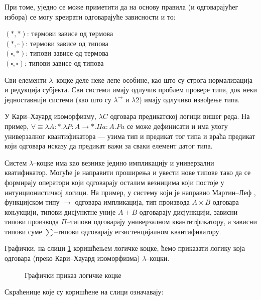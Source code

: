 При томе, уједно се може приметити да на основу правила (и
одговарајућег избора) се могу креирати одговарајуће зависности и то:

\begin{center}
$(*, *)$: термови зависе од термова \\
$(*, \square)$: термови зависе од типова \\
$(\square, *)$: типови зависе од термова \\
$(\square, \square)$: типови зависе од типова 
\end{center} 


Сви елементи $\lambda$--коцке деле неке лепе особине, као што су
строга нормализација и редукција субјекта. Сви системи имају одлучив
проблем провере типа, док неки једноставнији системи (као што су
$\lambda^{\to}$ и $\lambda2$) имају одлучиво извођење типа.

У Кари--Хауард изоморфизму, $\lambda C$ одговара предикатској логици
вишег реда. На пример, $\forall \equiv \lambda A: *. \lambda P: A \to
*. \Pi a: A. Pa$ се може дефинисати и има улогу универзалног
квантификатора --- узима тип и предикат тог типа и враћа предикат који
одговара исказу да предикат важи за сваки елемент датог типа. 


Систем $\lambda$--коцке има као везнике једино импликацију и
универзални кватификатор. Могуће је направити проширења и увести нове
типове тако да се формирају оператори који одговарају осталим
везницима који постоје у интуиционистичкој логици. На пример, у
систему који је направио Мартин--Леф \cite{martin1984intuitionistic},
функцијском типу $\to$ одговара импликација, тип производа $A \times
B$ одговара коњукцији, типови дисјунктне уније $A+B$ одговарају
дисјункцији, зависни типови производа $\Pi$--типови одговарају
универзалном квантитфикатору, а зависни типови суме $\sum$--типови
одговарају егзистенцијалном квантификатору.

Графички, на слици \ref{tab:lambdacube2} коришћењем логичке коцке,
ћемо приказати логику која одговара (преко Кари--Хауард изоморфизма)
$\lambda$--коцки.

\begin{figure}[!hb]
\begin{center}

\end{center}
\caption{Графички приказ логичке коцке}\label{tab:lambdacube2}
\end{figure}

Скраћенице које су коришћене на слици означавају:

